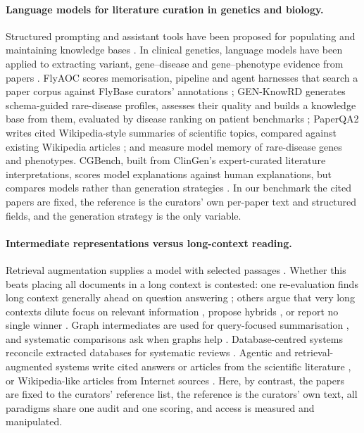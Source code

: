 \documentclass{article} %
\begin{document}
\paragraph{Language models for literature curation in genetics and biology.}
Structured prompting and assistant tools have been proposed for populating and maintaining knowledge bases \citep{caufield2024structured,caufield2024curategpt,toro2024dynamic,niyonkuru2025leveraging}. In clinical genetics, language models have been applied to extracting variant, gene--disease and gene--phenotype evidence from papers \citep{li2025autopm3,furlan2025eagleai,wang2026pubmind,yin2026benchmarking}. FlyAOC scores memorisation, pipeline and agent harnesses that search a paper corpus against FlyBase curators' annotations \citep{zhang2026flyaoc}; GEN-KnowRD generates schema-guided rare-disease profiles, assesses their quality and builds a knowledge base from them, evaluated by disease ranking on patient benchmarks \citep{yan2026genknowrd}; PaperQA2 writes cited Wikipedia-style summaries of scientific topics, compared against existing Wikipedia articles \citep{skarlinski2024language}; and \citet{groza2026systematic} measure model memory of rare-disease genes and phenotypes. CGBench, built from ClinGen's expert-curated literature interpretations, scores model explanations against human explanations, but compares models rather than generation strategies \citep{queen2025cgbench}. In our benchmark the cited papers are fixed, the reference is the curators' own per-paper text and structured fields, and the generation strategy is the only variable.

\paragraph{Intermediate representations versus long-context reading.}
Retrieval augmentation supplies a model with selected passages \citep{Lewis2020RetrievalaugmentedGeneration}. Whether this beats placing all documents in a long context is contested: one re-evaluation finds long context generally ahead on question answering \citep{Li2024LongContext}; others argue that very long contexts dilute focus on relevant information \citep{Yu2024DefenseRag}, propose hybrids \citep{li2024retrieval}, or report no single winner \citep{Li2025LaraBenchmarking}. Graph intermediates are used for query-focused summarisation \citep{edge2024local}, and systematic comparisons ask when graphs help \citep{han2025rag,xiang2025use}. Database-centred systems reconcile extracted databases for systematic reviews \citep{joshi2026sliders}. Agentic and retrieval-augmented systems write cited answers or articles from the scientific literature \citep{Lla2023PaperqaRetrievalaugmented,Asai2024OpenscholarSynthesizing,singh2025ai2,skarlinski2024language}, or Wikipedia-like articles from Internet sources \citep{shao2024assisting}. Here, by contrast, the papers are fixed to the curators' reference list, the reference is the curators' own text, all paradigms share one audit and one scoring, and access is measured and manipulated.
\end{document}
